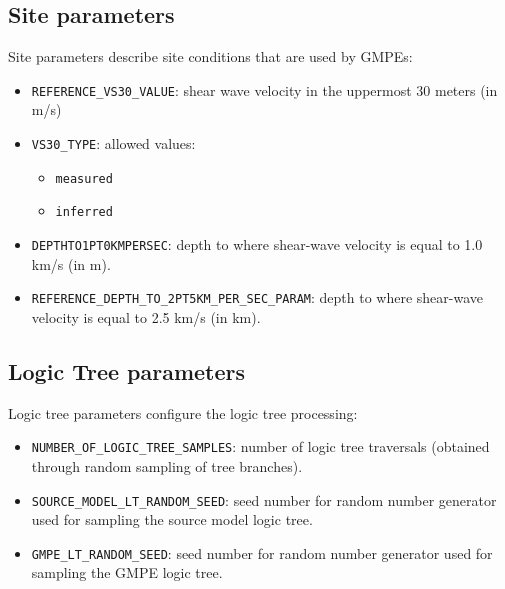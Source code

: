 \subsection{Site parameters}
Site parameters describe site conditions that are used by GMPEs:
\begin{itemize}
\item \Verb+REFERENCE_VS30_VALUE+: shear wave velocity in the uppermost 30 meters (in m/s)
\item \Verb+VS30_TYPE+: allowed values:
\begin{itemize}
\item \Verb+measured+
\item \Verb+inferred+
\end{itemize}
\item \Verb+DEPTHTO1PT0KMPERSEC+: depth to where shear-wave velocity is equal to 1.0 km/s (in m).
\item \Verb+REFERENCE_DEPTH_TO_2PT5KM_PER_SEC_PARAM+: depth to where shear-wave velocity is equal to 2.5 km/s (in km).
\end{itemize}

\subsection{Logic Tree parameters}
Logic tree parameters configure the logic tree processing:
\begin{itemize}
\item \Verb+NUMBER_OF_LOGIC_TREE_SAMPLES+: number of logic tree traversals (obtained through random sampling of tree branches).
\item \Verb+SOURCE_MODEL_LT_RANDOM_SEED+: seed number for random number generator used for sampling the source model logic tree.
\item \Verb+GMPE_LT_RANDOM_SEED+: seed number for random number generator used for sampling the GMPE logic tree.
\end{itemize}

